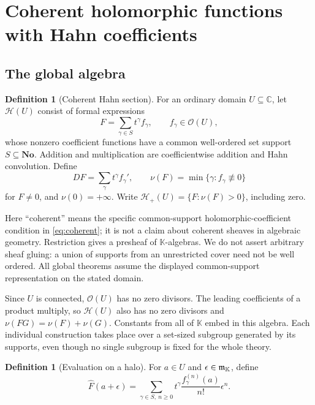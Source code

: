 \documentclass[11pt,a4paper]{article}
\theoremstyle{definition}\newtheorem{definition}[theorem]{Definition}
\theoremstyle{remark}\newtheorem{remark}[theorem]{Remark}
\newcommand{\No}{\mathbf{No}}
\newcommand{\K}{\mathbb K}
\newcommand{\C}{\mathbb C}\newcommand{\R}{\mathbb R}\newcommand{\N}{\mathbb N}\newcommand{\Z}{\mathbb Z}
\newcommand{\A}{\mathscr H}\newcommand{\hol}{\mathcal O}
\newcommand{\ev}[1]{\widehat{#1}}
\numberwithin{equation}{section}
\begin{document}
\section{Coherent holomorphic functions with Hahn coefficients}\label{sec:coherent}

\subsection{The global algebra}
\begin{definition}[Coherent Hahn section]
For an ordinary domain $U\subseteq\C$, let $\A(U)$ consist of formal expressions
\begin{equation}\label{eq:coherent}
 F=\sum_{\gamma\in S}t^\gamma f_\gamma,
 \qquad f_\gamma\in\hol(U),
\end{equation}
whose nonzero coefficient functions have a common well-ordered set support $S\subseteq\No$. Addition and multiplication are coefficientwise addition and Hahn convolution. Define
\[
 DF=\sum_\gamma t^\gamma f_\gamma',\qquad
 \nu(F)=\min\{\gamma:f_\gamma\not\equiv0\}
\]
for $F\ne0$, and $\nu(0)=+\infty$. Write $\A_+(U)=\{F:\nu(F)>0\}$, including zero.
\end{definition}
Here ``coherent'' means the specific common-support holomorphic-coefficient condition in \eqref{eq:coherent}; it is not a claim about coherent sheaves in algebraic geometry. Restriction gives a presheaf of $\K$-algebras. We do not assert arbitrary sheaf gluing: a union of supports from an unrestricted cover need not be well ordered. All global theorems assume the displayed common-support representation on the stated domain.

Since $U$ is connected, $\hol(U)$ has no zero divisors. The leading coefficients of a product multiply, so $\A(U)$ also has no zero divisors and $\nu(FG)=\nu(F)+\nu(G)$. Constants from all of $\K$ embed in this algebra. Each individual construction takes place over a set-sized subgroup generated by its supports, even though no single subgroup is fixed for the whole theory.

\begin{definition}[Evaluation on a halo]
For $a\in U$ and $\epsilon\in\infinit$, define
\begin{equation}\label{eq:evalcoherent}
 \ev F(a+\epsilon)
 =\sum_{\gamma\in S,\ n\geq0}
 t^\gamma\frac{f_\gamma^{(n)}(a)}{n!}\epsilon^n.
\end{equation}
\end{definition}
\end{document}
